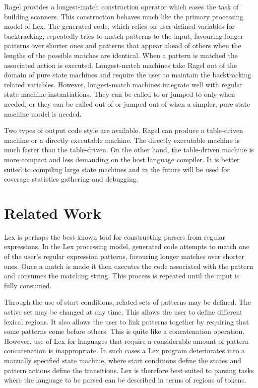 \documentclass[letterpaper,11pt,oneside]{book}
\begin{document}
Ragel provides a longest-match construction operator which eases the task of
building scanners. This construction behaves much like the primary processing
model of Lex. The generated code, which relies on user-defined variables for
backtracking, repeatedly tries to match patterns to the input, favouring longer
patterns over shorter ones and patterns that appear ahead of others when the
lengths of the possible matches are identical. When a pattern is matched the
associated action is executed. Longest-match machines take Ragel out of the
domain of pure state machines and require the user to maintain the backtracking
related variables.  However, longest-match machines integrate well with regular
state machine instantiations. They can be called to or jumped to only when
needed, or they can be called out of or jumped out of when a simpler, pure
state machine model is needed.

Two types of output code style are available. Ragel can produce a table-driven
machine or a directly executable machine. The directly executable machine is much
faster than the table-driven. On the other hand, the table-driven machine is
more compact and less demanding on the host language compiler. It is better
suited to compiling large state machines and in the future will be used for
coverage statistics gathering and debugging.

\section{Related Work}

Lex is perhaps the best-known tool for constructing parsers from regular
expressions. In the Lex processing model, generated code attempts to match one
of the user's regular expression patterns, favouring longer matches over
shorter ones. Once a match is made it then executes the code associated with
the pattern and consumes the matching string.  This process is repeated until
the input is fully consumed. 

Through the use of start conditions, related sets of patterns may be defined.
The active set may be changed at any time.  This allows the user to define
different lexical regions. It also allows the user to link patterns together by
requiring that some patterns come before others.  This is quite like a
concatenation operation. However, use of Lex for languages that require a
considerable amount of pattern concatenation is inappropriate. In such cases a
Lex program deteriorates into a manually specified state machine, where start
conditions define the states and pattern actions define the transitions.  Lex
is therefore best suited to parsing tasks where the language to be parsed can
be described in terms of regions of tokens. 
\end{document}
